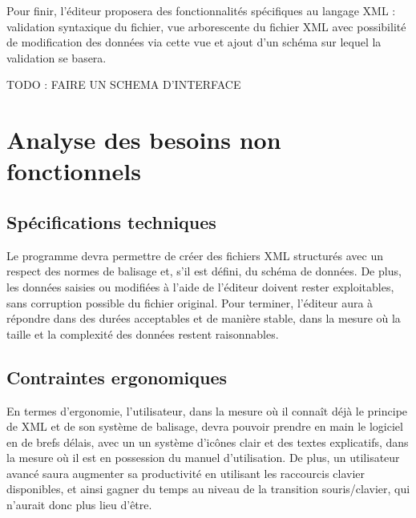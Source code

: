 	Pour finir, l'éditeur proposera des fonctionnalités spécifiques au langage XML : validation syntaxique du fichier, vue arborescente du fichier XML avec possibilité de modification des données via cette vue et ajout d'un schéma sur lequel la validation se basera.
	
	TODO : FAIRE UN SCHEMA D'INTERFACE
	
	\section{Analyse des besoins non fonctionnels}
		\subsection{Spécifications techniques}
		Le programme devra permettre de créer des fichiers XML structurés avec un respect des normes de balisage et, s'il est défini, du schéma de données. De plus, les données saisies ou modifiées à l'aide de l'éditeur doivent rester exploitables, sans corruption possible du fichier original. Pour terminer, l'éditeur aura à répondre dans des durées acceptables et de manière stable, dans la mesure où la taille et la complexité des données restent raisonnables.
		
		\subsection{Contraintes ergonomiques}
		En termes d'ergonomie, l'utilisateur, dans la mesure où il connaît déjà le principe de XML et de son système de balisage, devra pouvoir prendre en main le logiciel en de brefs délais, avec un un système d'icônes clair et des textes explicatifs, dans la mesure où il est en possession du manuel d'utilisation. De plus, un utilisateur avancé saura augmenter sa productivité en utilisant les raccourcis clavier disponibles, et ainsi gagner du temps au niveau de la transition souris/clavier, qui n'aurait donc plus lieu d'être.